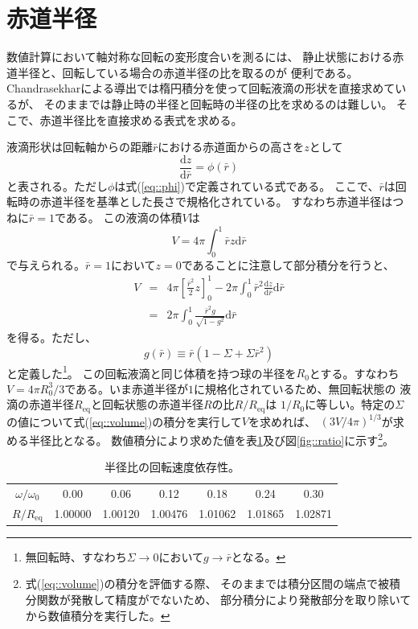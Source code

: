 \documentclass{jarticle}
\newcommand{\diff}{\mathrm d}
\begin{document}
\section{赤道半径}

数値計算において軸対称な回転の変形度合いを測るには、
静止状態における赤道半径と、回転している場合の赤道半径の比を取るのが
便利である。Chandrasekharによる導出では楕円積分を使って回転液滴の形状を直接求めているが、
そのままでは静止時の半径と回転時の半径の比を求めるのは難しい。
そこで、赤道半径比を直接求める表式を求める。

液滴形状は回転軸からの距離$\bar{r}$における赤道面からの高さを$z$として
\begin{equation}
\frac{\diff z}{\diff \bar{r}} = \phi(\bar{r})
\end{equation}
と表される。ただし$\phi$は式(\ref{eq::phi})で定義されている式である。
ここで、$\bar{r}$は回転時の赤道半径を基準とした長さで規格化されている。
すなわち赤道半径はつねに$\bar{r}=1$である。
この液滴の体積$V$は
\begin{equation}
V = 4\pi \int_0^1 \bar{r} z \diff \bar{r}
\end{equation}
で与えられる。$\bar{r} =1$において$z = 0$であることに注意して部分積分を行うと、
\begin{eqnarray}
V &=&  4\pi \left[\frac{\bar{r}^2}{2} z \right]_0^1 - 2\pi \int_0^1 \bar{r}^2 \frac{\diff z}{\diff \bar{r}} \diff \bar{r} \\
&=& 2\pi \int_0^1 \frac{\bar{r}^2g}{\sqrt{1-g^2}} \diff \bar{r}\label{eq::volume}
\end{eqnarray}
を得る。ただし、
\begin{equation}
g(\bar{r}) \equiv \bar{r} \left( 1 - \Sigma + \Sigma \bar{r}^2 \right)
\end{equation}
と定義した\footnote{無回転時、すなわち$\Sigma \rightarrow 0$において$g \rightarrow \bar{r}$となる。}。
この回転液滴と同じ体積を持つ球の半径を$R_0$とする。すなわち
$V=4\pi R_0^3/3$である。いま赤道半径が$1$に規格化されているため、無回転状態の
液滴の赤道半径$R_\mathrm{eq}$と回転状態の赤道半径$R$の比$R/R_\mathrm{eq}$は
$1/R_0$に等しい。特定の$\Sigma$の値について式(\ref{eq::volume})の積分を実行して$V$を求めれば、
$(3V/4\pi)^{1/3}$が求める半径比となる。
数値積分により求めた値を表\ref{tbl::ratio}及び図\ref{fig::ratio}に示す\footnote{式(\ref{eq::volume})の積分を評価する際、
そのままでは積分区間の端点で被積分関数が発散して精度がでないため、
部分積分により発散部分を取り除いてから数値積分を実行した。
}。

\begin{table}[htpb]
\begin{center}
\begin{tabular}{|c|cccccc|}
\hline
$\omega/\omega_0$ & 0.00 &  0.06 &  0.12 &  0.18  & 0.24  & 0.30 \\
$R/R_\mathrm{eq}$ & 1.00000 & 1.00120 &  1.00476 & 1.01062 & 1.01865 &  1.02871 \\
\hline
\end{tabular}
\end{center}
\caption{半径比の回転速度依存性。
}\label{tbl::ratio}
\end{table}
\end{document}
